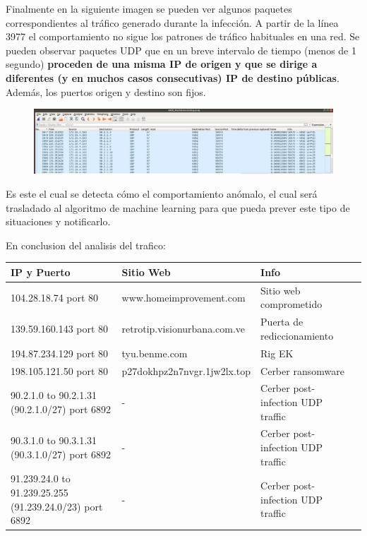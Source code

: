 \documentclass[a4paper,10pt]{article}
\begin{document}
Finalmente en la siguiente imagen se pueden ver algunos paquetes correspondientes al tráfico generado durante la infección. A partir de la línea 3977 el comportamiento no sigue los patrones de tráfico habituales en una red. Se pueden observar paquetes UDP que en un breve intervalo de tiempo (menos de 1 segundo) \textbf{proceden de una misma IP de origen y que se dirige a diferentes (y en muchos casos consecutivas) IP de destino públicas}. Además, los puertos origen y destino son fijos.

\begin{figure}[!htp]
\centering
\includegraphics[scale=0.3]{Wireshark/6.png} 
\caption{}
\end{figure}

\medskip

Es este el cual se detecta cómo el comportamiento anómalo, el cual será trasladado al algoritmo de machine learning para que pueda prever este tipo de situaciones y notificarlo.

\medskip

\newpage
En conclusion del analisis del trafico:







\begin{table}[htbp]
\begin{center}
\begin{tabular}{|l|l|l|l|}
\hline
IP y Puerto & Sitio Web & Info \\
\hline
104.28.18.74 port 80  & www.homeimprovement.com & Sitio web comprometido  \\
139.59.160.143 port 80 & retrotip.visionurbana.com.ve & Puerta de rediccionamiento\\
194.87.234.129 port 80 & tyu.benme.com & Rig EK\\
198.105.121.50 port 80 & p27dokhpz2n7nvgr.1jw2lx.top & Cerber ransomware\\
90.2.1.0 to 90.2.1.31 (90.2.1.0/27) port 6892 & - & Cerber post-infection UDP traffic\\
90.3.1.0 to 90.3.1.31 (90.3.1.0/27) port 6892 & -  & Cerber post-infection UDP traffic\\
91.239.24.0 to 91.239.25.255 (91.239.24.0/23) port 6892 & - & Cerber post-infection
UDP traffic\\

\hline

\end{tabular}
\label{tabla:sencilla}
\end{center}
\end{table}
\end{document}
